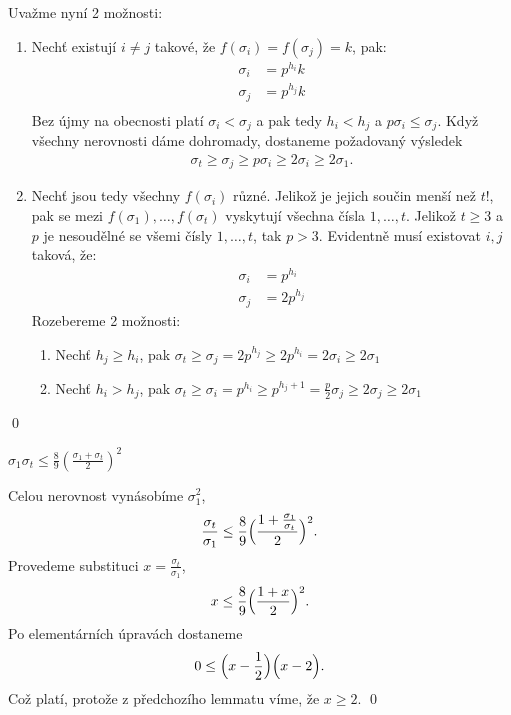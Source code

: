 Uvažme nyní 2 možnosti:
\begin{enumerate}
\item Nechť existují $i \neq j$ takové, že $f(\sigma_i) = f(\sigma_j) = k$, pak:
\begin{align*}
\sigma_i &= p^{h_i}k \\
\sigma_j &= p^{h_j}k \\
\end{align*}
Bez újmy na obecnosti platí $\sigma_i < \sigma_j$ a pak tedy $h_i < h_j$ a $p\sigma_i \leq \sigma_j$. Když všechny nerovnosti dáme dohromady, dostaneme požadovaný výsledek
\begin{align*}
\sigma_t \geq \sigma_j \geq p\sigma_i \geq 2\sigma_i \geq 2\sigma_1.
\end{align*}
\item Nechť jsou tedy všechny $f(\sigma_i)$ různé. Jelikož je jejich součin menší než $t!$, pak se mezi $f(\sigma_1),\dots ,f(\sigma_t)$ vyskytují všechna čísla $1,\dots,t$. Jelikož $t \geq 3$ a $p$ je nesoudělné se všemi čísly $1,\dots,t$, tak $p > 3$. Evidentně musí existovat $i,j$ taková, že:
\begin{align*}
\sigma_i &= p^{h_i} \\
\sigma_j &= 2p^{h_j}
\end{align*}
Rozebereme 2 možnosti:
\begin{enumerate}
\item Nechť $h_j \geq h_i$, pak $\sigma_t \geq \sigma_j = 2p^{h_j} \geq 2p^{h_i} = 2\sigma_i \geq 2\sigma_1$
\item Nechť $h_i > h_j$, pak $\sigma_t \geq \sigma_i = p^{h_i} \geq p^{h_j + 1} = \frac{p}{2}\sigma_j \geq 2\sigma_j \geq 2\sigma_1$
\end{enumerate}
\end{enumerate}
\qed

\lm $\sigma_1\sigma_t \leq \frac{8}{9}(\frac{\sigma_1 + \sigma_t}{2})^2$

\dk Celou nerovnost vynásobíme $\sigma^2_1$,
\begin{align*}
\frac{\sigma_t}{\sigma_1} \leq \frac{8}{9}\Bigl(\frac{1 + \frac{\sigma_1}{\sigma_t}}{2}\Bigr)^2.
\end{align*}
Provedeme substituci $x = \frac{\sigma_t}{\sigma_1}$,
\begin{align*}
x \leq \frac{8}{9}\Bigl(\frac{1 + x}{2}\Bigr)^2.
\end{align*}
Po elementárních úpravách dostaneme
\begin{align*}
0 \leq \Bigl(x - \frac{1}{2}\Bigr)\Bigl(x - 2\Bigr).
\end{align*}
Což platí, protože z předchozího lemmatu víme, že $x \geq 2$. \qed


